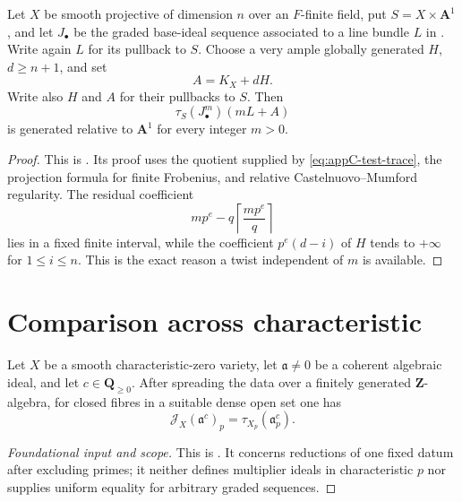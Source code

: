 \begin{proposition}\label{prop:appC-test-fixed-twist}
Let \(X\) be smooth projective of dimension \(n\) over an \(F\)-finite
field, put \(S=X\times\mathbf A^1\), and let \(J_\bullet\) be the graded
base-ideal sequence associated to a line bundle \(L\) in
.  Write again \(L\) for its pullback
to \(S\).
Choose a very ample globally generated \(H\), \(d\geq n+1\), and set
\[
 A=K_X+dH.
\]
Write also \(H\) and \(A\) for their pullbacks to \(S\).
Then
\[
 \tau_S(J_\bullet^m)(mL+A)
\tag{C.26}\label{eq:appC-test-fixed-twist}
\]
is generated relative to \(\mathbf A^1\) for every integer \(m>0\).
\end{proposition}

\begin{proof}
This is .  Its proof
uses the quotient supplied by \eqref{eq:appC-test-trace}, the projection
formula for finite Frobenius, and relative
Castelnuovo--Mumford regularity.  The residual coefficient
\[
 mp^e-q\left\lceil\frac{mp^e}{q}\right\rceil
\]
lies in a fixed finite interval, while the coefficient
\(p^e(d-i)\) of \(H\) tends to \(+\infty\) for \(1\leq i\leq n\).
This is the exact reason a twist independent of \(m\) is available.
\end{proof}

\section{Comparison across characteristic}
\label{sec:appC-comparison-characteristic}

\begin{theorem}\label{thm:appC-hara-yoshida}
Let \(X\) be a smooth characteristic-zero variety, let
\(\mathfrak a\ne0\) be a coherent algebraic ideal, and let
\(c\in\mathbf Q_{\geq0}\).
After spreading the data over a finitely generated
\(\mathbf Z\)-algebra, for closed fibres in a suitable dense open set one
has
\[
 \mathcal J_X(\mathfrak a^c)_p
 =\tau_{X_p}(\mathfrak a_p^c).
\tag{C.27}\label{eq:appC-reduction-comparison}
\]
\end{theorem}

\begin{proof}[Foundational input and scope]
This is \cite[Theorem~6.8]{HY03}.  It concerns reductions of one fixed datum
after excluding primes; it neither defines multiplier ideals in
characteristic \(p\) nor supplies uniform equality for arbitrary graded
sequences.
\end{proof}

